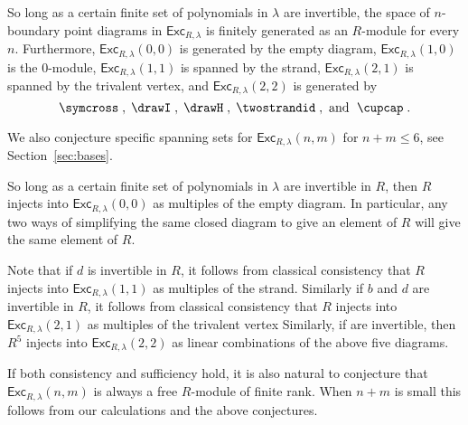 \documentclass[12pt]{amsart}
\begin{document}
\begin{conjecture}
  \label{conj:class-suffic}
So long as a certain finite set of polynomials in $\lambda$ are invertible,
the space of $n$-boundary point diagrams in $\mathsf{Exc}_{R,\lambda}$ is
finitely generated as an $R$-module for every $n$.  Furthermore,
$\mathsf{Exc}_{R,\lambda}(0,0)$ is generated by the empty diagram,
$\mathsf{Exc}_{R,\lambda}(1,0)$ is the $0$-module,
$\mathsf{Exc}_{R,\lambda}(1,1)$ is spanned by the strand,
$\mathsf{Exc}_{R,\lambda}(2,1)$ is spanned by the trivalent vertex, and
$\mathsf{Exc}_{R,\lambda}(2,2)$ is generated by $$\symcross\;, \; \drawI \;,
\; \drawH \;, \; \twostrandid \;, \text{ and } \; \cupcap \; .$$
\end{conjecture}

We also conjecture specific spanning sets for $\mathsf{Exc}_{R,\lambda}(n,m)$
for $n+m \leq 6$, see Section~\ref{sec:bases}.

\begin{conjecture}
  \label{conj:class-consist}
So long as a certain finite set of polynomials in $\lambda$ are invertible in
$R$, then $R$ injects into $\mathsf{Exc}_{R,\lambda}(0,0)$ as multiples of the
empty diagram.  In particular, any two ways of simplifying the same closed
diagram to give an element of $R$ will give the same element of $R$.
\end{conjecture}

Note that if $d$ is invertible in $R$, it follows from classical consistency
that $R$ injects into $\mathsf{Exc}_{R,\lambda}(1,1)$ as multiples of the
strand.  Similarly if $b$ and $d$ are invertible in $R$, it follows from
classical consistency that $R$ injects into $\mathsf{Exc}_{R,\lambda}(2,1)$ as
multiples of the trivalent vertex  Similarly, if 
are invertible, then $R^5$ injects into $\mathsf{Exc}_{R,\lambda}(2,2)$ as
linear combinations of the above five diagrams.


If both consistency and sufficiency hold, it is also natural to conjecture
that $\mathsf{Exc}_{R,\lambda}(n,m)$ is always a free $R$-module of finite
rank.  When $n+m$ is small this follows from our calculations and the above
conjectures.
\end{document}
